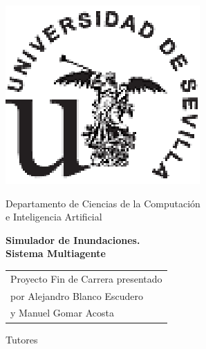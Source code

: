 \thispagestyle{empty}

{
\thispagestyle{empty}
\begin{center}
\includegraphics{figuras/titulo/logous-moderno.ps}
\end{center}
\vspace*{0cm}
\Large
\begin{center}
{\normalsize \sc
Departamento de Ciencias de la Computaci\'{o}n \\ e Inteligencia Artificial \\}

\end{center}

\vspace{0.5cm}

\LARGE

\begin{center}
{\bf Simulador de Inundaciones. \\ Sistema Multiagente}
\end{center}

\Large

\vspace*{2cm}
\vfill

\hspace*{.5\textwidth}
\normalsize
\begin{tabular}{l}

Proyecto Fin de Carrera presentado\\
por Alejandro Blanco Escudero \\
y Manuel Gomar Acosta \\

\end{tabular} \par

\vspace*{-2.9cm}

Tutores

\vspace*{4cm}

}
